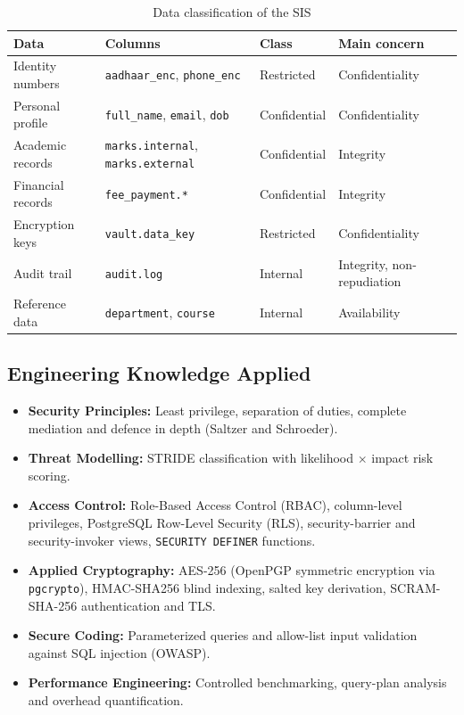 \documentclass[11pt,a4paper]{report}
\begin{document}
\begin{table}[H]
    \centering
    \caption{Data classification of the SIS}
    \label{tab:classify}
    \small
    \begin{tabularx}{\textwidth}{|l|Y|l|l|}
        \hline
        \textbf{Data} & \textbf{Columns} & \textbf{Class} & \textbf{Main concern} \\ \hline
        Identity numbers & \texttt{aadhaar\_enc}, \texttt{phone\_enc} & Restricted & Confidentiality \\ \hline
        Personal profile & \texttt{full\_name}, \texttt{email}, \texttt{dob} & Confidential & Confidentiality \\ \hline
        Academic records & \texttt{marks.internal}, \texttt{marks.external} & Confidential & Integrity \\ \hline
        Financial records & \texttt{fee\_payment.*} & Confidential & Integrity \\ \hline
        Encryption keys & \texttt{vault.data\_key} & Restricted & Confidentiality \\ \hline
        Audit trail & \texttt{audit.log} & Internal & Integrity, non-repudiation \\ \hline
        Reference data & \texttt{department}, \texttt{course} & Internal & Availability \\ \hline
    \end{tabularx}
\end{table}

\subsection{Engineering Knowledge Applied}
\begin{itemize}
    \item \textbf{Security Principles:} Least privilege, separation of duties, complete mediation and defence in depth (Saltzer and Schroeder).
    \item \textbf{Threat Modelling:} STRIDE classification with likelihood $\times$ impact risk scoring.
    \item \textbf{Access Control:} Role-Based Access Control (RBAC), column-level privileges, PostgreSQL Row-Level Security (RLS), security-barrier and security-invoker views, \texttt{SECURITY DEFINER} functions.
    \item \textbf{Applied Cryptography:} AES-256 (OpenPGP symmetric encryption via \texttt{pgcrypto}), HMAC-SHA256 blind indexing, salted key derivation, SCRAM-SHA-256 authentication and TLS.
    \item \textbf{Secure Coding:} Parameterized queries and allow-list input validation against SQL injection (OWASP).
    \item \textbf{Performance Engineering:} Controlled benchmarking, query-plan analysis and overhead quantification.
\end{itemize}
\end{document}
